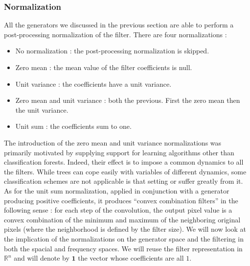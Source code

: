 \documentclass[a4paper]{report}
\begin{document}
			\subsubsection{Normalization}
			All the generators we discussed in the previous section are able to perform a post-processing normalization of the filter. There are four normalizations :
			
			\begin{itemize}
				\item No normalization : the post-processing normalization is skipped.
				\item Zero mean : the mean value of the filter coefficients is null.
				\item Unit variance : the coefficients have a unit variance.
				\item Zero mean and unit variance : both the previous. First the zero mean then the unit variance.
				\item Unit sum : the coefficients sum to one.
			\end{itemize}
			
			The introduction of the zero mean and unit variance normalizations was primarily motivated by supplying support for learning algorithms other than classification forests. Indeed, their effect is to impose a common dynamics to all the filters. While trees can cope easily with variables of different dynamics, some classification schemes are not applicable is that setting or suffer greatly from it.
			As for the unit sum normalization, applied in conjunction with a generator producing positive coefficients, it produces ``convex combination filters'' in the following sense : for each step of the convolution, the output pixel value is a convex combination of the minimum and maximum of the neighboring original pixels (where the neighborhood is defined by the filter size).
			We will now look at the implication of the normalizations on the generator space and the filtering in both the spacial and frequency spaces. We will reuse the filter representation in $\mathbb{R}^n$ and will denote by $\textbf{1}$ the vector whose coefficients are all $1$.
			
\end{document}

